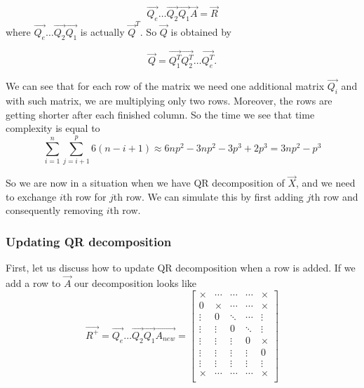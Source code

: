 \begin{equation}
    \vec{Q_e}\ldots\vec{Q_2}\vec{Q_1}\vec{A} = \vec{R}
\end{equation}
where $\vec{Q_e}\ldots\vec{Q_2}\vec{Q_1}$ is actually $\vec{Q}^T$. So $\vec{Q}$ is obtained by 

\begin{equation}
 \vec{Q} = \vec{Q_1^T}\vec{Q_2^T}\ldots\vec{Q_e^T}.
\end{equation}

We can see that for each row of the matrix we need one additional matrix $\vec{Q_i}$ and with such matrix, we are multiplying only two rows. Moreover, the rows are getting shorter after each finished column. So the time we see that time complexity is equal to
\begin{equation}
    \sum\limits_{i=1}^n  \sum\limits_{j=i+1}^p 6(n-i+1) \approx 6np^2 - 3np^2 - 3p^3 + 2p^3 = 3np^2 - p^3
\end{equation}

So we are now in a situation when we have QR decomposition of $\vec{X}$, and we need to exchange $i$th row for $j$th row. We can simulate this by first adding $j$th row and consequently removing $i$th row.



\subsubsection*{Updating QR decomposition}
First, let us discuss how to update QR decomposition when a row is added. 
If we add a row to $\vec{A}$ our decomposition looks like
\begin{equation}
    \vec{R^{+}} = \vec{Q_e}\ldots\vec{Q_2}\vec{Q_1}\vec{A_{new}}  = 
    \begin{bmatrix}
        \times & \cdots & \cdots & \cdots & \times \\
        0 &\times & \cdots & \cdots & \times \\
        \vdots& 0&\ddots & \cdots & \vdots \\
        \vdots& \vdots&0 & \ddots &  \vdots \\
        \vdots& \vdots& \vdots& 0& \times \\
        \vdots& \vdots& \vdots& \vdots& 0  \\
        \vdots& \vdots& \vdots& \vdots& \vdots \\
        \times & \cdots & \cdots & \cdots & \times \\
    \end{bmatrix}
\end{equation}

